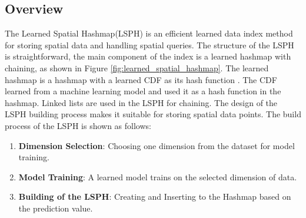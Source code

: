 \subsection{Overview}
\begin{figure}[ht]
\end{figure}

The Learned Spatial Hashmap(LSPH) is an efficient learned data index method for storing spatial data and handling spatial queries. The structure of the LSPH is straightforward, the main component of the index is a learned hashmap with chaining, as shown in Figure \ref{fig:learned_spatial_hashmap}. The learned hashmap is a hashmap with a learned CDF as its hash function \cite{Kraska:2017vh}. The CDF learned from a machine learning model and used it as a hash function in the hashmap. Linked lists are used in the LSPH for chaining. The design of the LSPH building process makes it suitable for storing spatial data points. The build process of the LSPH is shown as follows:

\begin{enumerate}
    \item \textbf{Dimension Selection}: Choosing one dimension from the dataset for model training.
    \item \textbf{Model Training}: A learned model trains on the selected dimension of data. 
    \item \textbf{Building of the LSPH}: Creating and Inserting to the Hashmap based on the prediction value.
\end{enumerate}

